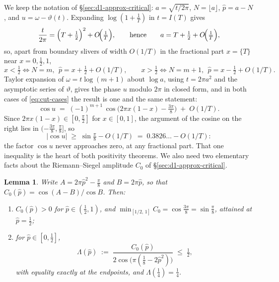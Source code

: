 \documentclass[11pt]{article}
\newtheorem{lemma}[theorem]{Lemma}
\theoremstyle{definition}
\begin{document}
We keep the notation of \S\ref{sec:d1-approx-critical}: $a=\sqrt{t/2\pi}$,
$N=\lfloor a\rfloor$, $\hat p=a-N$, and $u=\omega-\vartheta(t)$. Expanding
$\log(1+\tfrac1T)$ in $t=I(T)$ gives
\begin{equation}\label{eq:a-vs-T}
\frac{t}{2\pi}=\Bigl(T+\tfrac12\Bigr)^{2}+O\!\Bigl(\tfrac1T\Bigr),
\qquad\text{hence}\qquad
a=T+\tfrac12+O\!\Bigl(\tfrac1{T}\Bigr),
\end{equation}
so, apart from boundary slivers of width $O(1/T)$ in the fractional part
$x=\{T\}$ near $x=0,\tfrac12,1$,
\begin{equation}\label{eq:cut-cases}
x<\tfrac12 \iff N=m,\ \ \hat p=x+\tfrac12+O(1/T),
\qquad
x>\tfrac12 \iff N=m+1,\ \ \hat p=x-\tfrac12+O(1/T).
\end{equation}
Taylor expansion of $\omega=t\log(m+1)$ about $\log a$, using $t=2\pi a^{2}$
and the asymptotic series of $\vartheta$, gives the phase $u$ modulo $2\pi$
in closed form, and in both cases of \eqref{eq:cut-cases} the result is one
and the same statement:
\begin{equation}\label{eq:cosu}
\cos u \;=\;(-1)^{m+1}\,
\cos\!\bigl(2\pi x(1-x)-\tfrac{3\pi}8\bigr)\;+\;O(1/T).
\end{equation}
Since $2\pi x(1-x)\in[0,\tfrac\pi2]$ for $x\in[0,1]$, the argument of the
cosine on the right lies in $(-\tfrac{3\pi}8,\tfrac\pi8]$, so
\begin{equation}\label{eq:cosu-bound}
|\cos u|\;\geq\;\sin\tfrac\pi8-O(1/T)\;=\;0.3826\ldots-O(1/T):
\end{equation}
the factor $\cos u$ never approaches zero, at any fractional part. That one
inequality is the heart of both positivity theorems. We also need two
elementary facts about the Riemann--Siegel amplitude $C_0$ of
\S\ref{sec:d1-approx-critical}.

\begin{lemma}\label{lem:C0-trig}
Write $A=2\pi\hat p^{2}-\tfrac\pi8$ and $B=2\pi\hat p$, so that
$C_0(\hat p)=\cos(A-B)/\cos B$. Then:
\begin{enumerate}
\item[(i)] $C_0(\hat p)>0$ for $\hat p\in(\tfrac12,1)$, and
$\min_{[1/2,\,1]}C_0=\cos\tfrac{3\pi}8=\sin\tfrac\pi8$, attained at
$\hat p=\tfrac12$;
\item[(ii)] for $\hat p\in[0,\tfrac12]$,
\[
\Lambda(\hat p)\;:=\;\frac{C_0(\hat p)}
{2\cos\bigl(\pi(\tfrac18-2\hat p^{2})\bigr)}
\;\leq\;\tfrac12,
\]
with equality exactly at the endpoints, and $\Lambda(\tfrac14)=\tfrac14$.
\end{enumerate}
\end{lemma}
\end{document}
